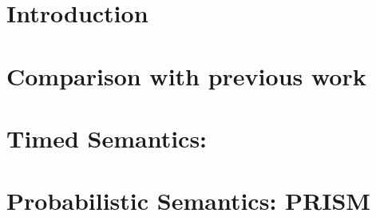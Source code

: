 
\chapter{Introduction}\label{cha:semantics-intro}


\chapter{Comparison with previous work}\label{cha:semantics-review}


\chapter{Timed Semantics: \tockcsp}\label{cha:semantics-tockcsp}


\chapter{Probabilistic Semantics: PRISM}\label{cha:semantics-prism}
%

